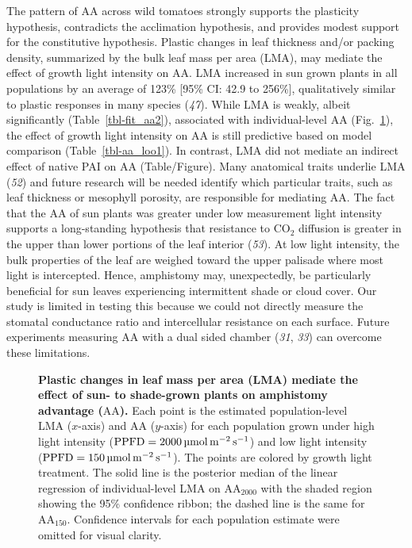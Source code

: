 \documentclass[
  letterpaper,
  DIV=11,
  numbers=noendperiod]{scrartcl}
\newcommand{\aahigh}{\mathrm{AA}_{2000}}
\newcommand{\aalow}{\mathrm{AA}_{150}}
\newcommand{\aax}{$\mathrm{AA}$}
\newcommand{\ppfdequals}[1]{$\mathrm{PPFD} = \qty{#1}{\micro\mol\raiseto{-2}\meter\raiseto{-1}\second}$}
\begin{document}
The pattern of \aax{} across wild tomatoes strongly supports the
plasticity hypothesis, contradicts the acclimation hypothesis, and
provides modest support for the constitutive hypothesis. Plastic changes
in leaf thickness and/or packing density, summarized by the bulk leaf
mass per area (LMA), may mediate the effect of growth light intensity on
\aax{}. LMA increased in sun grown plants in all populations by an
average of 123\% {[}95\% CI: 42.9 to 256\%{]}, qualitatively similar to
plastic responses in many species (\emph{47}). While LMA is weakly,
albeit significantly (Table~\ref{tbl-fit_aa2}), associated with
individual-level \aax{} (Fig.~\ref{fig-lma_aa}), the effect of growth
light intensity on \aax{} is still predictive based on model comparison
(Table~\ref{tbl-aa_loo1}). In contrast, LMA did not mediate an indirect
effect of native PAI on \aax{} (Table/Figure). Many anatomical traits
underlie LMA (\emph{52}) and future research will be needed identify
which particular traits, such as leaf thickness or mesophyll porosity,
are responsible for mediating \aax{}. The fact that the \aax{} of sun
plants was greater under low measurement light intensity supports a
long-standing hypothesis that resistance to CO\(_2\) diffusion is
greater in the upper than lower portions of the leaf interior
(\emph{53}). At low light intensity, the bulk properties of the leaf are
weighed toward the upper palisade where most light is intercepted.
Hence, amphistomy may, unexpectedly, be particularly beneficial for sun
leaves experiencing intermittent shade or cloud cover. Our study is
limited in testing this because we could not directly measure the
stomatal conductance ratio and intercellular resistance on each surface.
Future experiments measuring \aax{} with a dual sided chamber
(\emph{31}, \emph{33}) can overcome these limitations.

\begin{figure}


\caption{\label{fig-lma_aa}\textbf{Plastic changes in leaf mass per area (LMA) mediate the effect of sun- to shade-grown plants on amphistomy advantage (\aax{}).}
Each point is the estimated population-level LMA (\(x\)-axis) and \aax{}
(\(y\)-axis) for each population grown under high light intensity
(\ppfdequals{2000}) and low light intensity (\ppfdequals{150}). The
points are colored by growth light treatment. The solid line is the
posterior median of the linear regression of individual-level LMA on
\(\aahigh\) with the shaded region showing the 95\% confidence ribbon;
the dashed line is the same for \(\aalow\). Confidence intervals for
each population estimate were omitted for visual clarity.}

\end{figure}%
\end{document}
